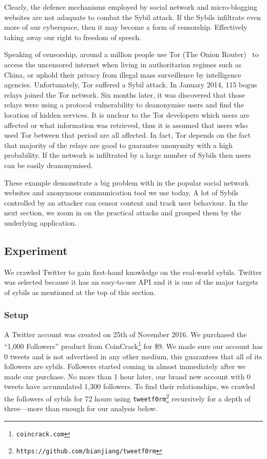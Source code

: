 Clearly, the defence mechanisms employed by social network and micro-blogging
websites are not adaquate to combat the Sybil attack. If the Sybils infiltrate
even more of our cyberspace, then it may become a form of censorship.
Effectively taking away our right to freedom of speech.

Speaking of censorship, around a million \cite{tormetric} people use Tor (The
Onion Router)~\cite{dingledine2004tor} to access the uncensored internet when
living in authoritarian regimes such as China, or uphold their privacy from
illegal mass surveillence by intelligence agencies. Unfortunately, Tor suffered
a Sybil attack. In January 2014, 115 bogus relays joined the Tor network. Six months
later, it was discovered that those relays were using a protocol vulnerability
to deanonymise users and find the location of hidden services. It is unclear to
the Tor developers which users are affected or what information was retrieved,
thus it is assumed that users who used Tor between that period are all
affected\cite{torsybil}. In fact, Tor depends on the fact that majority of the
relays are good to guarantee anonymity with a high probability. If the network
is infiltrated by a large number of Sybils then users can be easily
deanonymised.

These example demonstrate a big problem with in the popular social network
websites and anonymous communication tool we use today. A lot of Sybils
controlled by an attacker can censor content and track user behaviour. In the
next section, we zoom in on the practical attacks and grouped them by the
underlying application.

\subsection{Experiment}
We crawled Twitter to gain first-hand knowledge on the real-world sybils.
Twitter was selected because it has an easy-to-use API and it is one of the
major targets of sybils as mentioned at the top of this section.

\subsubsection{Setup}
A Twitter account was created on 25th of November 2016. We purchased the ``1,000
Followers'' product from CoinCrack\footnote{\texttt{coincrack.com}} for \$9. We
made sure our account has 0 tweets and is not advertised in any other medium,
this guarantees that all of its followers are sybils. Followers started coming
in almost immediately after we made our purchase. No more than 1 hour later, our
brand new account with 0 tweets have accumulated 1,300 followers. To find their
relationships, we crawled the followers of sybils for 72 hours using
\verb!tweetf0rm!\footnote{\texttt{https://github.com/bianjiang/tweetf0rm}}
recursively for a depth of three---more than enough for our analysis below.

